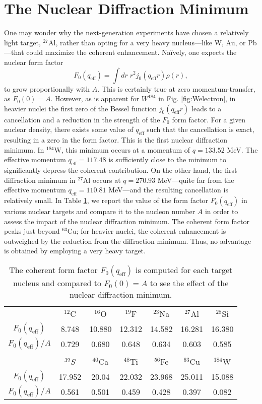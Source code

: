 \documentclass{book}[letterpaper,12pt]
\begin{document}
\section{The Nuclear Diffraction Minimum}
One may wonder why the next-generation experiments have chosen a relatively light target, $^{27}$Al, rather than opting for a very heavy nucleus---like W, Au, or Pb---that could maximize the coherent enhancement. Na\"ively, one expects the nuclear form factor
\begin{equation}
F_0(q_\mathrm{eff})=\int dr \;r^2j_0(q_\mathrm{eff}r)\rho(r),
\end{equation} 
to grow proportionally with $A$. This is certainly true at zero momentum-transfer, as $F_0(0) = A$. However, as is apparent for $W^{184}$ in Fig. \ref{fig:Welectron}, in heavier nuclei the first zero of the Bessel function $j_0(q_\mathrm{eff}r)$ leads to a cancellation and a reduction in the strength of the $F_0$ form factor. For a given nuclear density, there exists some value of $q_\mathrm{eff}$ such that the cancellation is exact, resulting in a zero in the form factor. This is the first nuclear diffraction minimum. In $^{184}$W, this minimum occurs at a momentum of $q=133.52$ MeV. The effective momentum $q_\mathrm{eff}=117.48$ is sufficiently close to the minimum to significantly depress the coherent contribution. On the other hand, the first diffraction minimum in $^{27}$Al occurs at $q=270.93$ MeV---quite far from the effective momentum $q_\mathrm{eff}=110.81$ MeV---and the resulting cancellation is relatively small. In Table \ref{tab:diff_min}, we report the value of the form factor $F_0(q_\mathrm{eff})$ in various nuclear targets and compare it to the nucleon number $A$ in order to assess the impact of the nuclear diffraction minimum. The coherent form factor peaks just beyond $^{63}$Cu; for heavier nuclei, the coherent enhancement is outweighed by the reduction from the diffraction minimum. Thus, no advantage is obtained by employing a very heavy target.
\begin{table}
\centering
\begin{tabular}{ccccccc}
\hline
\hline
 & $^{12}$C & $^{16}$O & $^{19}$F & $^{23}$Na & $^{27}$Al & $^{28}$Si \\
 $F_0(q_\mathrm{eff})$ & 8.748 & 10.880 & 12.312 & 14.582 & 16.281 & 16.380 \\
$F_0(q_\mathrm{eff})/A$ & 0.729 & 0.680 & 0.648 & 0.634 & 0.603 & 0.585\\
\\
  & $^{32}S$ & $^{40}$Ca & $^{48}$Ti & $^{56}$Fe & $^{63}$Cu & $^{184}$W \\
 $F_0(q_\mathrm{eff})$ & 17.952 & 20.04 & 22.032 & 23.968 & 25.011 & 15.088\\
$F_0(q_\mathrm{eff})/A$  & 0.561 & 0.501 & 0.459 & 0.428 & 0.397 & 0.082\\
  \hline
  \hline
\end{tabular}
\caption{The coherent form factor $F_0(q_\mathrm{eff})$ is computed for each target nucleus and compared to $F_0(0)=A$ to see the effect of the nuclear diffraction minimum.}
\label{tab:diff_min}
\end{table}
\end{document}
